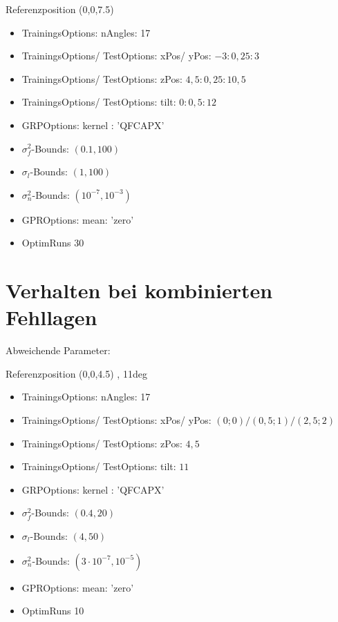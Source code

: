 Referenzposition (0,0,7.5)

\begin{itemize}
	\item TrainingsOptions: nAngles: 17
	\item TrainingsOptions/ TestOptions: xPos/ yPos: $-3:0,25:3$
	\item TrainingsOptions/ TestOptions: zPos: $4,5:0,25:10,5$
	\item TrainingsOptions/ TestOptions: tilt: $0:0,5:12$
	\item GRPOptions: kernel : 'QFCAPX'
	\item $\sigma_f^2$-Bounds: $(0.1,100)$
	\item $\sigma_l$-Bounds: $(1,100)$
	\item $\sigma_n^2$-Bounds: $(10^{-7},10^{-3})$
	\item GPROptions: mean: 'zero'
	\item OptimRuns 30
\end{itemize}


\section{Verhalten bei kombinierten Fehllagen}\label{sec:paramexp6}


Abweichende Parameter:

Referenzposition (0,0,4.5) , 11deg 

\begin{itemize}
	\item TrainingsOptions: nAngles: 17
	\item TrainingsOptions/ TestOptions: xPos/ yPos: $(0;0)/(0,5;1)/(2,5;2)$
	\item TrainingsOptions/ TestOptions: zPos: $4,5$
	\item TrainingsOptions/ TestOptions: tilt: $11$
	\item GRPOptions: kernel : 'QFCAPX'
	\item $\sigma_f^2$-Bounds: $(0.4,20)$
	\item $\sigma_l$-Bounds: $(4,50)$
	\item $\sigma_n^2$-Bounds: $(3\cdot10^{-7},10^{-5})$
	\item GPROptions: mean: 'zero'
	\item OptimRuns 10
\end{itemize}

